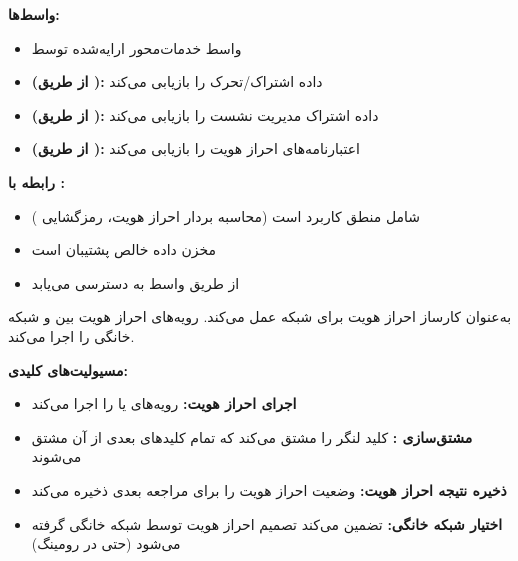 \textbf{واسط‌ها:}

\begin{itemize}
\tightlist
\item
   واسط خدمات‌محور ارایه‌شده توسط 
\item
  \textbf{ (از طریق ):}  داده اشتراک/\allowbreak{}تحرک را بازیابی می‌کند
\item
  \textbf{ (از طریق ):}  داده اشتراک مدیریت نشست را بازیابی می‌کند
\item
  \textbf{ (از طریق ):}  اعتبارنامه‌های احراز هویت را بازیابی می‌کند
\end{itemize}

\textbf{رابطه با :}

\begin{itemize}
\tightlist
\item
   شامل منطق کاربرد است (محاسبه بردار احراز هویت، رمزگشایی )
\item
   مخزن داده خالص پشتیبان است
\item
   از طریق واسط  به  دسترسی می‌یابد
\end{itemize}


 به‌عنوان کارساز احراز هویت برای شبکه  عمل می‌کند. رویه‌های احراز هویت بین  و شبکه خانگی را اجرا می‌کند.

\textbf{مسیولیت‌های کلیدی:}

\begin{itemize}
\tightlist
\item
  \textbf{اجرای احراز هویت:} رویه‌های  یا  را اجرا می‌کند
\item
  \textbf{مشتق‌سازی :} کلید لنگر  را مشتق می‌کند که تمام کلیدهای بعدی از آن مشتق می‌شوند
\item
  \textbf{ذخیره نتیجه احراز هویت:} وضعیت احراز هویت را برای مراجعه بعدی ذخیره می‌کند
\item
  \textbf{اختیار شبکه خانگی:} تضمین می‌کند تصمیم احراز هویت توسط شبکه خانگی گرفته می‌شود (حتی در رومینگ)
\end{itemize}

